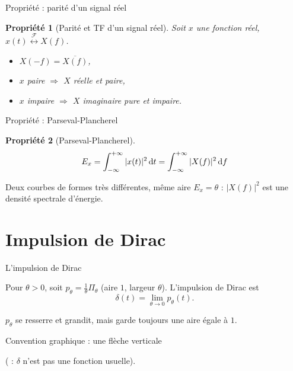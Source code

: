 \documentclass[aspectratio=43,10pt]{beamer}
\newtheorem{proposition}{Propriété}
\newcommand{\tf}{\overset{\mathcal F}{\longleftrightarrow}}
\newcommand{\slidefig}[2]{%
\begin{center}
\resizebox{#1}{!}{}
\end{center}
}
\begin{document}
\begin{frame}{Propriété : parité d'un signal réel}
    \begin{proposition}[Parité et TF d'un signal réel]
        Soit $x$ une fonction réel, $x(t)\tf X(f)$.
        \begin{itemize}
            \item $X(-f) = \overline{X(f)}$, 
            \item $x$ paire $\Rightarrow$ $X$ réelle et paire, 
            \item $x$ impaire $\Rightarrow$ $X$ imaginaire pure et impaire.
        \end{itemize}
    \end{proposition}

\end{frame}

\begin{frame}{Propriété : Parseval-Plancherel}
    \begin{proposition}[Parseval-Plancherel]
        $$
            E_x = \int_{-\infty}^{+\infty} |x(t)|^2\,{\rm d} t = \int_{-\infty}^{+\infty} |X(f)|^2\,{\rm d} f
        $$
    \end{proposition}
    \slidefig{\textwidth}{parseval-porte.tex}
    \begin{center}
        \small Deux courbes de formes très différentes, même aire
        $E_x=\theta$ : $|X(f)|^2$ est une densité spectrale d'énergie.
    \end{center}
\end{frame}

\section{Impulsion de Dirac}

\begin{frame}{L'impulsion de Dirac}
    \begin{definition}
        Pour $\theta>0$, soit $p_\theta = \frac1\theta\Pi_\theta$ (aire
        $1$, largeur $\theta$). L'impulsion de Dirac est
        $$
            \delta(t) = \lim_{\theta\to0} p_\theta(t).
        $$
    \end{definition}
    \begin{overprint}
    \slidefig{\textwidth}{dirac-as-limit.tex}
    \begin{center}\small $p_\theta$ se resserre et grandit, mais garde
    toujours une aire égale à $1$.\end{center}
    \slidefig{0.4\textwidth}{dirac-arrow-single.tex}
    \begin{center}\small Convention graphique : une flèche verticale

    ( : $\delta$ n'est pas une fonction usuelle).\end{center}
    \end{overprint}
\end{frame}
\end{document}
